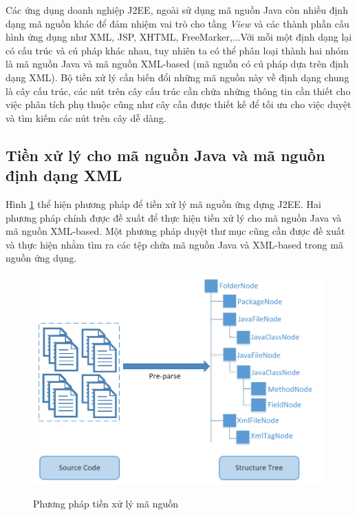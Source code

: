 \documentclass[12pt]{report}
\begin{document}
Các ứng dụng doanh nghiệp J2EE, ngoài sử dụng mã nguồn Java còn nhiều định dạng mã nguồn khác để đảm nhiệm vai trò cho tầng \textit{View} và các thành phần cấu hình ứng dụng như XML, JSP, XHTML, FreeMarker,...Với mỗi một định dạng lại có cấu trúc và cú pháp khác nhau, tuy nhiên ta có thể phân loại thành hai nhóm là mã nguồn Java và mã nguồn XML-based (mã nguồn có cú pháp dựa trên định dạng XML). Bộ tiền xử lý cần biến đổi những mã nguồn này về định dạng chung là cây cấu trúc, các nút trên cây cấu trúc cần chứa những thông tin cần thiết cho việc phân tích phụ thuộc cũng như cây cần được thiết kế để tối ưu cho việc duyệt và tìm kiếm các nút trên cây dễ dàng.

\subsection{Tiền xử lý cho mã nguồn Java và mã nguồn định dạng XML}
Hình \ref{fig:preprocess} thể hiện phương pháp để tiền xử lý mã nguồn ứng dựng J2EE. Hai phương pháp chính được đề xuất để thực hiện tiền xử lý cho mã nguồn Java và mã nguồn XML-based. Một phương pháp duyệt thư mục cũng cần được đề xuất và thực hiện nhằm tìm ra các tệp chứa mã nguồn Java và XML-based trong mã nguồn ứng dụng.

\begin{figure}[h]
	\centering
	\includegraphics[scale=0.5]{preprocess}
	\label{fig:preprocess}
	\caption{Phương pháp tiền xử lý mã nguồn}
\end{figure}
\end{document}
